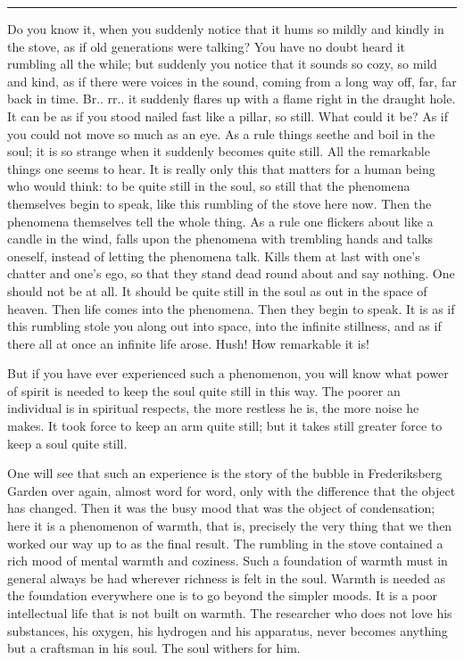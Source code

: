 \documentclass[12pt,a4paper,openany]{book}
\newcommand{\opage}[1]{\marginnote{\footnotesize\textit{[#1]}}}
\newcommand{\sectionrule}{\par\begin{center}\rule{4em}{0.4pt}\end{center}}
\begin{document}
\sectionrule

Do you know it, when you suddenly notice
that it hums so mildly and kindly in the stove, as if
old generations were talking? You have no doubt heard it rumbling all
the while; but suddenly you notice that it sounds
so cozy, so mild and kind, as if there were voices
in the sound, coming from a long way off, far, far back in time.
Br.. rr.. it suddenly flares up with a flame right in
the draught hole. It can be as if you stood nailed fast like
a pillar, so still. What could it be? As if you could not
move so much as an eye. As a rule things seethe and boil
in the soul; it is so strange when it suddenly becomes
quite still. All the remarkable things one seems to hear.
It is really only this that matters for a human being who
would think: to be quite still in the soul, so still that the phenomena
themselves begin to speak, like this rumbling of the stove
\setcounter{footnote}{0}%
\opage{299}here now. Then the phenomena themselves tell the whole thing. As a rule
one flickers about like a candle in the wind, falls upon the phenomena
with trembling hands and talks oneself, instead of
letting the phenomena talk. Kills them at last with one's chatter and
one's ego, so that they stand dead round about and say nothing. One
should not be at all. It should be quite still in the soul as
out in the space of heaven. Then life comes into the phenomena. Then
they begin to speak. It is as if this rumbling stole you
along out into space, into the infinite stillness, and as if there all at
once an infinite life arose. Hush! How remarkable it is!

But if you have ever experienced such a phenomenon,
you will know what power of spirit is needed to keep
the soul quite still in this way. The poorer an individual is in spiritual
respects, the more restless he is, the more noise he makes.
It took force to keep an arm quite still; but it
takes still greater force to keep a soul quite still.

One will see that such an experience is the story of the bubble
in Frederiksberg Garden over again, almost word for word, only
with the difference that the object has changed. Then it was
the busy mood that was the object of condensation; here
it is a phenomenon of warmth, that is, precisely the very thing that we then
worked our way up to as the final result. The rumbling in
the stove contained a rich mood of mental warmth and
coziness. Such a foundation of warmth must in general
always be had wherever richness is felt in the soul.
Warmth is needed as the foundation everywhere one is to go beyond
the simpler moods. It is a poor intellectual life that
is not built on warmth. The researcher who does not love his
substances, his oxygen, his hydrogen and his apparatus, never becomes anything but
a craftsman in his soul. The soul withers for him.
\opage{300}
\end{document}
